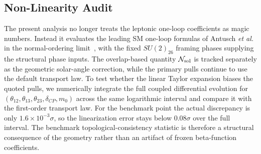 \documentclass[11pt]{article}
\begin{document}
\subsection{Non-Linearity Audit}

The present analysis no longer treats the leptonic one-loop coefficients as magic numbers. Instead it evaluates the leading SM one-loop formulas of Antusch \emph{et al.} in the normal-ordering limit~\cite{antusch2005}, with the fixed $SU(2)_{26}$ framing phases supplying the structural phase inputs. The overlap-based quantity $\mathcal N_{\rm sol}$ is tracked separately as the geometric solar-angle correction, while the primary pulls continue to use the default transport law. To test whether the linear Taylor expansion biases the quoted pulls, we numerically integrate the full coupled differential evolution for $(\theta_{12},\theta_{13},\theta_{23},\delta_{CP},m_0)$ across the same logarithmic interval and compare it with the first-order transport law. For the benchmark point the actual discrepancy is only $1.6\times10^{-3}\sigma$, so the linearization error stays below $0.08\sigma$ over the full interval. The benchmark topological-consistency statistic is therefore a structural consequence of the geometry rather than an artifact of frozen beta-function coefficients.
\end{document}
